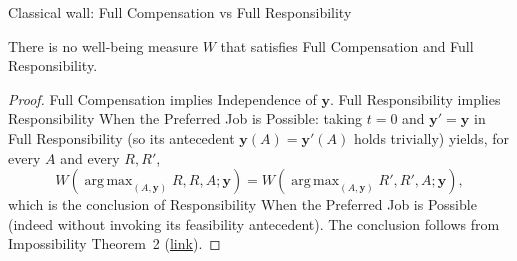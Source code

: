 \documentclass[10pt]{beamer}
\DeclareMathOperator*{\argmax}{arg\,max}
\begin{document}
\begin{frame}[allowframebreaks]{Classical wall: Full Compensation vs Full Responsibility}
\hypertarget{imp:classical}{}%
\hyperlink{tab:classification}{}

\scriptsize
\begin{corollary}
There is no well-being measure $W$ that satisfies Full Compensation and Full
Responsibility.
\end{corollary}

\begin{proof}
Full Compensation implies Independence of $\mathbf y$. Full Responsibility
implies Responsibility When the Preferred Job is Possible: taking $t=0$ and
$\mathbf y'=\mathbf y$ in Full Responsibility (so its antecedent
$\mathbf y(A)=\mathbf y'(A)$ holds trivially) yields, for every $A$ and every
$R,R'$,
\begin{equation*}
W(\argmax_{(A,\mathbf y)}R,R,A;\mathbf y)
=W(\argmax_{(A,\mathbf y)}R',R',A;\mathbf y),
\end{equation*}
which is the conclusion of Responsibility When the Preferred Job is Possible
(indeed without invoking its feasibility antecedent). The conclusion follows
from Impossibility Theorem~2 (\hyperlink{imp:thm2}{link}).
\end{proof}

\medskip
\hyperlink{tab:classification}{}
\end{frame}
\end{document}
